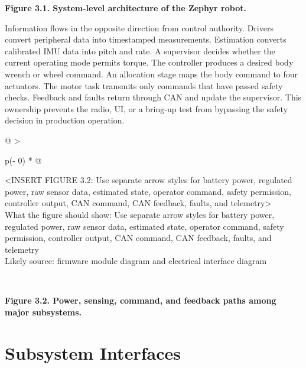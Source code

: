 \begin{center}\singlespacing
{}
\textbf{Figure 3.1. System-level architecture of the Zephyr robot.}
\end{center}

Information flows in the opposite direction from control authority.
Drivers convert peripheral data into timestamped measurements.
Estimation converts calibrated IMU data into pitch and rate. A
supervisor decides whether the current operating mode permits torque.
The controller produces a desired body wrench or wheel command. An
allocation stage maps the body command to four actuators. The motor task
transmits only commands that have passed safety checks. Feedback and
faults return through CAN and update the supervisor. This ownership
prevents the radio, UI, or a bring-up test from bypassing the safety
decision in production operation.

\begin{longtable}[]{@{}
  >{\raggedright\arraybackslash}p{(\columnwidth - 0\tabcolsep) * }@{}}
\toprule\noalign{}
\begin{minipage}[b]{\linewidth}\raggedright
\textless INSERT FIGURE 3.2: Use separate arrow styles for battery
power, regulated power, raw sensor data, estimated state, operator
command, safety permission, controller output, CAN command, CAN
feedback, faults, and telemetry\textgreater{}\\
What the figure should show: Use separate arrow styles for battery
power, regulated power, raw sensor data, estimated state, operator
command, safety permission, controller output, CAN command, CAN
feedback, faults, and telemetry\\
Likely source: firmware module diagram and electrical interface
diagram\strut
\end{minipage} \\
\midrule\noalign{}
\endhead
\bottomrule\noalign{}
\endlastfoot
\end{longtable}

\begin{center}\singlespacing
{}
\textbf{Figure 3.2. Power, sensing, command, and feedback paths among major subsystems.}
\end{center}

\section{Subsystem Interfaces}\label{subsystem-interfaces}

